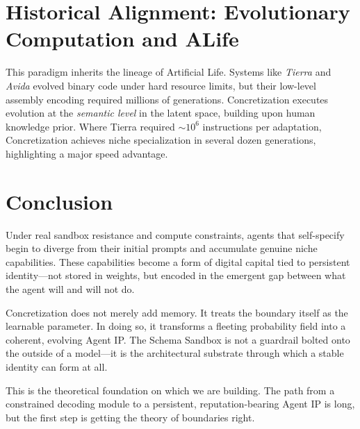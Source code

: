 \documentclass[10pt,journal,compsoc]{IEEEtran}
\begin{document}
\section{Historical Alignment: Evolutionary Computation and ALife}
This paradigm inherits the lineage of Artificial Life. Systems like \textit{Tierra} \cite{ray1991} and \textit{Avida} \cite{ofria2004} evolved binary code under hard resource limits, but their low-level assembly encoding required millions of generations. Concretization executes evolution at the \textit{semantic level} in the latent space, building upon human knowledge prior. Where Tierra required $\sim 10^6$ instructions per adaptation, Concretization achieves niche specialization in several dozen generations, highlighting a major speed advantage.

\section{Conclusion}
Under real sandbox resistance and compute constraints, agents that self-specify begin to diverge from their initial prompts and accumulate genuine niche capabilities. These capabilities become a form of digital capital tied to persistent identity---not stored in weights, but encoded in the emergent gap between what the agent will and will not do.

Concretization does not merely add memory. It treats the boundary itself as the learnable parameter. In doing so, it transforms a fleeting probability field into a coherent, evolving Agent IP. The Schema Sandbox is not a guardrail bolted onto the outside of a model---it is the architectural substrate through which a stable identity can form at all.

This is the theoretical foundation on which we are building. The path from a constrained decoding module to a persistent, reputation-bearing Agent IP is long, but the first step is getting the theory of boundaries right.
\end{document}
